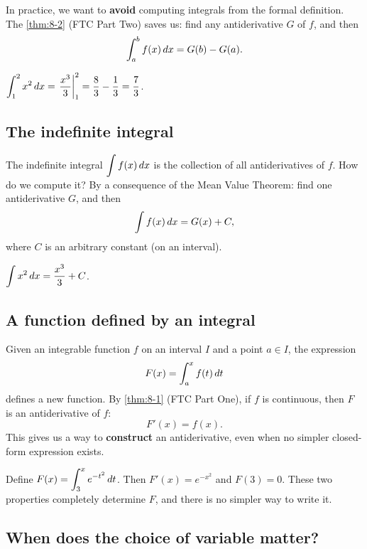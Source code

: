 In practice, we want to \textbf{avoid} computing integrals from the formal definition.  The \cref{thm:8-2} (FTC Part Two) saves us: find any antiderivative $G$ of $f$, and then
\[
  \int_{a}^{b} f(x)\,dx = G(b) - G(a).
\]

\begin{example}
\label{ex:8-9}
$\displaystyle\int_{1}^{2} x^{2}\,dx = \left.\frac{x^{3}}{3}\right\rvert_{1}^{2} = \frac{8}{3} - \frac{1}{3} = \frac{7}{3}$.
\end{example}

\subsection*{The indefinite integral}

The indefinite integral $\displaystyle\int f(x)\,dx$ is the collection of all antiderivatives of $f$.  How do we compute it?  By a consequence of the Mean Value Theorem: find one antiderivative $G$, and then
\[
  \int f(x)\,dx = G(x) + C,
\]
where $C$ is an arbitrary constant (on an interval).

\begin{example}
\label{ex:8-10}
$\displaystyle\int x^{2}\,dx = \frac{x^{3}}{3} + C$.
\end{example}

\subsection*{A function defined by an integral}

Given an integrable function $f$ on an interval $I$ and a point $a \in I$, the expression
\[
  F(x) = \int_{a}^{x} f(t)\,dt
\]
defines a new function.  By \cref{thm:8-1} (FTC Part One), if $f$ is continuous, then $F$ is an antiderivative of $f$:
\[
  F'(x) = f(x).
\]
This gives us a way to \textbf{construct} an antiderivative, even when no simpler closed-form expression exists.

\begin{example}
\label{ex:8-11}
Define $F(x) = \displaystyle\int_{3}^{x} e^{-t^{2}}\,dt$.  Then $F'(x) = e^{-x^{2}}$ and $F(3) = 0$.  These two properties completely determine $F$, and there is no simpler way to write it.
\end{example}

\subsection*{When does the choice of variable matter?}

